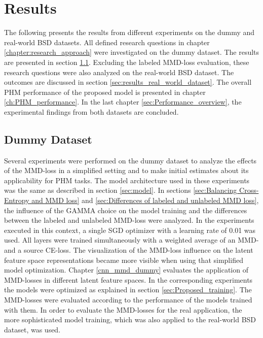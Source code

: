 \chapter{Results}\label{sec:results}

The following presents the results from different experiments on the dummy and real-world BSD datasets. All defined research questions in chapter \ref{chapter:research_approach} were investigated on the dummy dataset. The results are presented in section \ref{sec:results_dummy_dataset}. Excluding the labeled MMD-loss evaluation, these research questions were also analyzed on the real-world BSD dataset. The outcomes are discussed in section \ref{sec:results_real_world_dataset}. The overall PHM performance of the proposed model is presented in chapter \ref{ch:PHM_performance}. In the last chapter \ref{sec:Performance_overview}, the experimental findings from both datasets are concluded.




\section{Dummy Dataset}\label{sec:results_dummy_dataset}
Several experiments were performed on the dummy dataset to analyze the effects of the MMD-loss in a simplified setting and to make initial estimates about its applicability for PHM tasks. The model architecture used in these experiments was the same as described in section \ref{sec:model}. In sections \ref{sec:Balancing Cross-Entropy and MMD loss} and \ref{sec:Differences of labeled and unlabeled MMD loss}, the influence of the GAMMA choice on the model training and the differences between the labeled and unlabeled MMD-loss were analyzed. In the experiments executed in this context, a single SGD optimizer with a learning rate of 0.01 was used. All layers were trained simultaneously with a weighted average of an MMD- and a source CE-loss. The visualization of the MMD-loss influence on the latent feature space representations became more visible when using that simplified model optimization. Chapter \ref{cnn_mmd_dummy} evaluates the application of MMD-losses in different latent feature spaces. In the corresponding experiments the models were optimized as explained in section \ref{sec:Proposed_training}. The MMD-losses were evaluated according to the performance of the models trained with them. In order to evaluate the MMD-losses for the real application, the more sophisticated model training, which was also applied to the real-world BSD dataset, was used.


